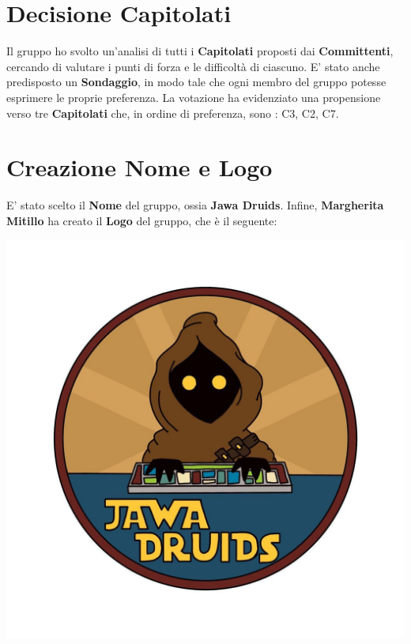 	\section{Decisione Capitolati}
	Il gruppo ho svolto un'analisi di tutti i \textbf{Capitolati} proposti dai \textbf{Committenti}, cercando di valutare i punti di forza e le difficoltà di ciascuno. 
	E' stato anche predisposto un \textbf{Sondaggio}, in modo tale che ogni membro del gruppo potesse esprimere le proprie preferenza. 
	La votazione ha evidenziato una propensione verso tre \textbf{Capitolati} che, in ordine di preferenza, sono : C3, C2, C7.
	 
	\section{Creazione Nome e Logo}
	E' stato scelto il \textbf{Nome} del gruppo, ossia \textbf{Jawa Druids}.
	Infine, \textbf{Margherita Mitillo} ha creato il  \textbf{Logo} del gruppo, che è il seguente:\\
	\begin{center}
			\includegraphics[width=0.5\linewidth]{../../immagini/DRUIDSLOGO.jpg}\\[4ex]
	\end{center}

